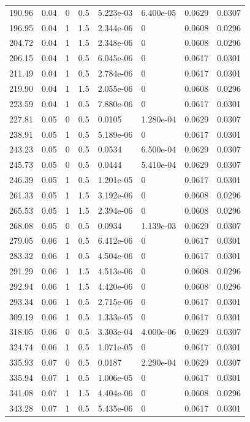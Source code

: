 \documentclass[preview]{standalone}
\begin{document}
{{\begin{tabular}{L{1.2cm}C{1.2cm} C{0.3cm}C{0.5cm} C{1.4cm}C{1.4cm} C{1.4cm}C{1.4cm}}
  190.96  &  0.04  & 0     & 0.5 &  5.223e-03  & 6.400e-05  & 0.0629 &  0.0307   \\ 
  196.95  &  0.04  & 1     & 1.5 &  2.344e-06  & 0  & 0.0608 &  0.0296   \\ 
  204.72  &  0.04  & 1     & 1.5 &  2.348e-06  & 0  & 0.0608 &  0.0296   \\ 
  206.15  &  0.04  & 1     & 0.5 &  6.045e-06  & 0  & 0.0617 &  0.0301   \\ 
  211.49  &  0.04  & 1     & 0.5 &  2.784e-06  & 0  & 0.0617 &  0.0301   \\ 
  219.90  &  0.04  & 1     & 1.5 &  2.055e-06  & 0  & 0.0608 &  0.0296   \\ 
  223.59  &  0.04  & 1     & 0.5 &  7.880e-06  & 0  & 0.0617 &  0.0301   \\ 
  227.81  &  0.05  & 0     & 0.5 &  0.0105  & 1.280e-04  & 0.0629 &  0.0307   \\ 
  238.91  &  0.05  & 1     & 0.5 &  5.189e-06  & 0  & 0.0617 &  0.0301   \\ 
  243.23  &  0.05  & 0     & 0.5 &  0.0534  & 6.500e-04  & 0.0629 &  0.0307   \\ 
  245.73  &  0.05  & 0     & 0.5 &  0.0444  & 5.410e-04  & 0.0629 &  0.0307   \\ 
  246.39  &  0.05  & 1     & 0.5 &  1.201e-05  & 0  & 0.0617 &  0.0301   \\ 
  261.33  &  0.05  & 1     & 1.5 &  3.192e-06  & 0  & 0.0608 &  0.0296   \\ 
  265.53  &  0.05  & 1     & 1.5 &  2.394e-06  & 0  & 0.0608 &  0.0296   \\ 
  268.08  &  0.05  & 0     & 0.5 &  0.0934  & 1.139e-03  & 0.0629 &  0.0307   \\ 
  279.05  &  0.06  & 1     & 0.5 &  6.412e-06  & 0  & 0.0617 &  0.0301   \\ 
  283.32  &  0.06  & 1     & 0.5 &  4.504e-06  & 0  & 0.0617 &  0.0301   \\ 
  291.29  &  0.06  & 1     & 1.5 &  4.513e-06  & 0  & 0.0608 &  0.0296   \\ 
  292.94  &  0.06  & 1     & 1.5 &  4.420e-06  & 0  & 0.0608 &  0.0296   \\ 
  293.34  &  0.06  & 1     & 0.5 &  2.715e-06  & 0  & 0.0617 &  0.0301   \\ 
  309.19  &  0.06  & 1     & 0.5 &  1.333e-05  & 0  & 0.0617 &  0.0301   \\ 
  318.05  &  0.06  & 0     & 0.5 &  3.303e-04  & 4.000e-06  & 0.0629 &  0.0307   \\ 
  324.74  &  0.06  & 1     & 0.5 &  1.071e-05  & 0  & 0.0617 &  0.0301   \\ 
  335.93  &  0.07  & 0     & 0.5 &  0.0187  & 2.290e-04  & 0.0629 &  0.0307   \\ 
  335.94  &  0.07  & 1     & 0.5 &  1.006e-05  & 0  & 0.0617 &  0.0301   \\ 
  341.08  &  0.07  & 1     & 1.5 &  4.404e-06  & 0  & 0.0608 &  0.0296   \\ 
  343.28  &  0.07  & 1     & 0.5 &  5.435e-06  & 0  & 0.0617 &  0.0301   \\ 
\hline 
\end{tabular} 

}}
\end{document}
